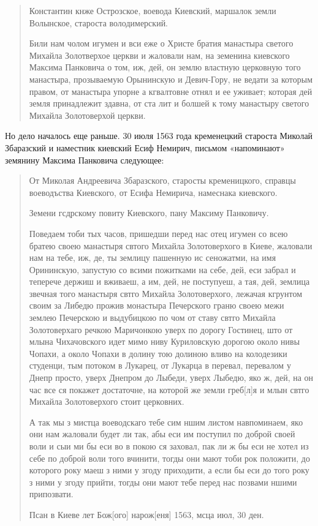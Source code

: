 \begin{quotation}
Константин кнже Острозское, воевода Киевский, маршалок земли Волынское, староста володимерский.

Били нам чолом игумен и вси еже о Христе братия манастыра светого Михайла Золотверхое церкви и жаловали нам, на земенина киевского Максима Панковича о том, иж, дей, он землю властную церковную того манастыра, прозываемую Орынинскую и Девич-Гору, не ведати за которым правом, от манастыра упорне а кгвалтовне отнял и ее уживает; которая дей земля принадлежит здавна, от ста лит и болшей к тому манастыру светого Михайла Золотоверхой церкви.
\end{quotation}

Но дело началось еще раньше. 30 июля 1563 года кременецкий староста Миколай Збаразский и наместник киевский Есиф Немирич, письмом «напоминают» земянину Максима Панковича следующее\cite{mihdocs}: 

\begin{quotation}
От Миколая Андреевича Збаразского, старосты кременицкого, справцы воеводъства Киевского, от Есифа Немирича, намеснака киевского.

Земени гсдрскому повиту Киевского, пану Максиму Панковичу.

Поведаем тоби тых часов, пришедши перед нас отец игумен со всею братею своею манастыря свтого Михайла Золотоверхого в Киеве, жаловали нам на тебе, иж, де, ты землицу пашенную ис сеножатми, на имя Орининскую, запустую со всими пожитками на себе, дей, еси забрал и теперече держиш и вживаеш, а им, дей, не поступуеш, а тая, дей, землица звечная того манастыря свтго Михайла Золотоверхого, лежачая кгрунтом своим за Либедю прожив монастыра Печерского граню своею межи землею Печерскою и выдубицкою по чом от ставу свтго Михайла Золотоверхаго речкою Маричонкою уверх по дорогу Гостинец, што от млына Чихачовского идет мимо ниву Куриловскую дорогою около нивы Чопахи, а около Чопахи в долину тою долиною вливо на колодезики студенци, тым потоком в Лукарец, от Лукарца в перевал, перевалом у Днепр просто, уверх Днепром до Лыбеди, уверх Лыбедю, яко ж, дей, на он час все ся покажет достаточне, на которой же земли греб[л]я и млын свтго Михайла Золотоверхого стоит церковних. 

А так мы з мистца воеводскаго тебе сим ншим листом навпоминаем, яко они нам жаловали будет ли так, абы еси им поступил по доброй своей воли и сыи ми бы еси во в покою ся заховал, пак ли ж бы еси не хотел из себе по доброй воли того вчинити, тогды они мают тоби рок положити, до которого року маеш з ними у згоду приходити, а если бы еси до того року з ними у згоду прийти, тогды они мают тебе перед нас позвами ншими припозвати.

Псан в Киеве лет Бож[ого] нарож[еня] 1563, мсца июл, 30 ден.
\end{quotation}

